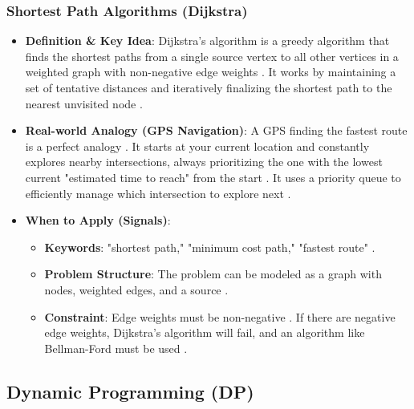 \documentclass{article}
\begin{document}
\subsubsection{Shortest Path Algorithms (Dijkstra)}
\begin{itemize}
\item \textbf{Definition \& Key Idea}: Dijkstra's algorithm is a greedy algorithm that finds the shortest paths from a single source vertex to all other vertices in a weighted graph with non-negative edge weights \cite{691, 692}. It works by maintaining a set of tentative distances and iteratively finalizing the shortest path to the nearest unvisited node \cite{692}.
\item \textbf{Real-world Analogy (GPS Navigation)}: A GPS finding the fastest route is a perfect analogy \cite{695}. It starts at your current location and constantly explores nearby intersections, always prioritizing the one with the lowest current "estimated time to reach" from the start \cite{696}. It uses a priority queue to efficiently manage which intersection to explore next \cite{697}.
\item \textbf{When to Apply (Signals)}:
\begin{itemize}
\item \textbf{Keywords}: "shortest path," "minimum cost path," "fastest route" \cite{702}.
\item \textbf{Problem Structure}: The problem can be modeled as a graph with nodes, weighted edges, and a source \cite{702}.
\item \textbf{Constraint}: Edge weights must be non-negative \cite{703}. If there are negative edge weights, Dijkstra's algorithm will fail, and an algorithm like Bellman-Ford must be used \cite{703}.
\end{itemize}
\end{itemize}

\subsection{Dynamic Programming (DP)}
\end{document}
